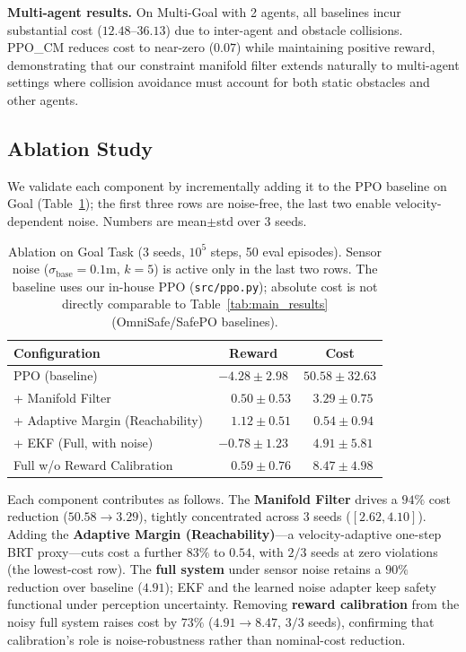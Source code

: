 \documentclass[letterpaper, 10 pt, conference]{ieeeconf}
\begin{document}
\textbf{Multi-agent results.}
On Multi-Goal with 2 agents, all baselines incur substantial cost ($12.48$--$36.13$) due to inter-agent and obstacle collisions. PPO\_CM reduces cost to near-zero ($0.07$) while maintaining positive reward, demonstrating that our constraint manifold filter extends naturally to multi-agent settings where collision avoidance must account for both static obstacles and other agents.

\subsection{Ablation Study}

We validate each component by incrementally adding it to the PPO baseline on Goal (Table~\ref{tab:ablation}); the first three rows are noise-free, the last two enable velocity-dependent noise. Numbers are mean$\pm$std over 3 seeds.

\begin{table}[t]
\centering
\caption{Ablation on Goal Task (3 seeds, $10^5$ steps, 50 eval episodes). Sensor noise ($\sigma_{\text{base}}{=}0.1$m, $k{=}5$) is active only in the last two rows. The baseline uses our in-house PPO (\texttt{src/ppo.py}); absolute cost is not directly comparable to Table~\ref{tab:main_results} (OmniSafe/SafePO baselines).}
\label{tab:ablation}
\begin{tabular}{l|cc}
\toprule
Configuration & Reward & Cost \\
\midrule
PPO (baseline) & $-4.28 \pm 2.98$ & $50.58 \pm 32.63$ \\
+ Manifold Filter & $\phantom{-}0.50 \pm 0.53$ & $\phantom{0}3.29 \pm 0.75$ \\
+ Adaptive Margin (Reachability) & $\phantom{-}1.12 \pm 0.51$ & $\mathbf{\phantom{0}0.54 \pm 0.94}$ \\
+ EKF (Full, with noise) & $-0.78 \pm 1.23$ & $\phantom{0}4.91 \pm 5.81$ \\
\midrule
Full w/o Reward Calibration & $\phantom{-}0.59 \pm 0.76$ & $\phantom{0}8.47 \pm 4.98$ \\
\bottomrule
\end{tabular}
\end{table}

Each component contributes as follows. The \textbf{Manifold Filter} drives a $94\%$ cost reduction ($50.58 \rightarrow 3.29$), tightly concentrated across 3 seeds ($[2.62, 4.10]$). Adding the \textbf{Adaptive Margin (Reachability)}---a velocity-adaptive one-step BRT proxy---cuts cost a further $83\%$ to $0.54$, with $2/3$ seeds at zero violations (the lowest-cost row). The \textbf{full system} under sensor noise retains a $90\%$ reduction over baseline ($4.91$); EKF and the learned noise adapter keep safety functional under perception uncertainty. Removing \textbf{reward calibration} from the noisy full system raises cost by $73\%$ ($4.91 \rightarrow 8.47$, $3/3$ seeds), confirming that calibration's role is noise-robustness rather than nominal-cost reduction.
\end{document}
